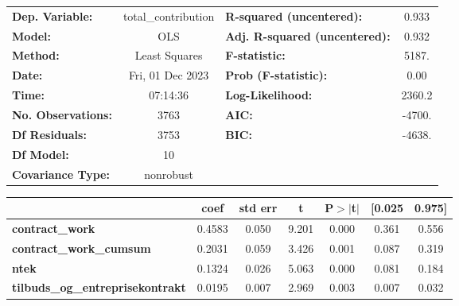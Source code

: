 \begin{center}
\begin{tabular}{lclc}
\toprule
\textbf{Dep. Variable:}                  & total\_contribution & \textbf{  R-squared (uncentered):}      &     0.933   \\
\textbf{Model:}                          &         OLS         & \textbf{  Adj. R-squared (uncentered):} &     0.932   \\
\textbf{Method:}                         &    Least Squares    & \textbf{  F-statistic:       }          &     5187.   \\
\textbf{Date:}                           &   Fri, 01 Dec 2023  & \textbf{  Prob (F-statistic):}          &     0.00    \\
\textbf{Time:}                           &       07:14:36      & \textbf{  Log-Likelihood:    }          &    2360.2   \\
\textbf{No. Observations:}               &          3763       & \textbf{  AIC:               }          &    -4700.   \\
\textbf{Df Residuals:}                   &          3753       & \textbf{  BIC:               }          &    -4638.   \\
\textbf{Df Model:}                       &            10       & \textbf{                     }          &             \\
\textbf{Covariance Type:}                &      nonrobust      & \textbf{                     }          &             \\
\bottomrule
\end{tabular}
\begin{tabular}{lcccccc}
                                         & \textbf{coef} & \textbf{std err} & \textbf{t} & \textbf{P$> |$t$|$} & \textbf{[0.025} & \textbf{0.975]}  \\
\midrule
\textbf{contract\_work}                  &       0.4583  &        0.050     &     9.201  &         0.000        &        0.361    &        0.556     \\
\textbf{contract\_work\_cumsum}          &       0.2031  &        0.059     &     3.426  &         0.001        &        0.087    &        0.319     \\
\textbf{ntek}                            &       0.1324  &        0.026     &     5.063  &         0.000        &        0.081    &        0.184     \\
\textbf{tilbuds\_og\_entreprisekontrakt} &       0.0195  &        0.007     &     2.969  &         0.003        &        0.007    &        0.032     \\

\end{tabular}
\end{center}
